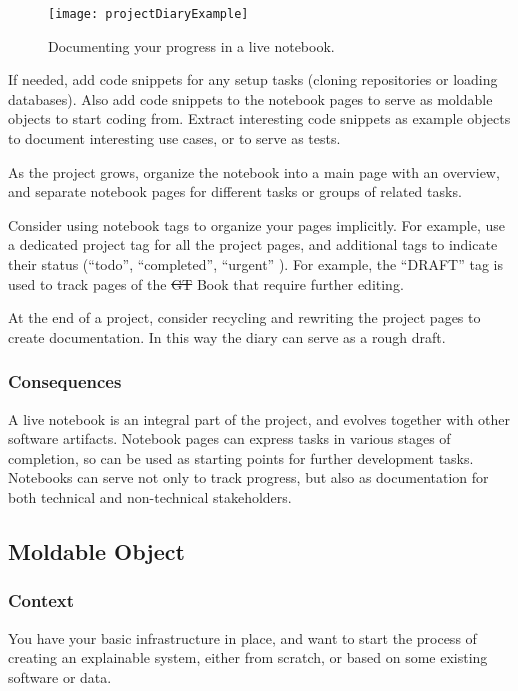 \documentclass[sigconf]{acmart}
\newcommand{\GT}{\st{GT}\xspace} %
\begin{document}
\begin{figure}[h]
  \texttt{[image: projectDiaryExample]}
  \caption{Documenting your progress in a live notebook.}
  \label{fig:projectDiary}
\end{figure}

If needed, add code snippets for any setup tasks (\eg cloning repositories or loading databases).
Also add code snippets to the notebook pages to serve as moldable objects to start coding from.
Extract interesting code snippets as example objects to document interesting use cases, or to serve as tests.

As the project grows, organize the notebook into a main page with an overview, and separate notebook pages for different tasks or groups of related tasks.

Consider using notebook tags to organize your pages implicitly. For example, use a dedicated project tag for all the project pages, and additional tags to indicate their status (``todo'', ``completed'', ``urgent'' \etc).
For example, the ``DRAFT'' tag is used to track pages of the \GT Book that require further editing.

At the end of a project, consider recycling and rewriting the project pages to create documentation. In this way the diary can serve as a rough draft.

\subsubsection*{Consequences}

A live notebook is an integral part of the project, and evolves together with other software artifacts.
Notebook pages can express tasks in various stages of completion, so can be used as starting points for further development tasks.
Notebooks can serve not only to track progress, but also as documentation for both technical and non-technical stakeholders.

\subsection*{Moldable Object}\label{pat:moldableObject}
\subsubsection*{Context}
You have your basic infrastructure in place, and want to start the process of creating an explainable system, either from scratch, or based on some existing software or data.
\end{document}
